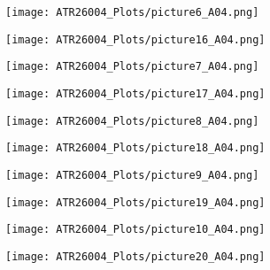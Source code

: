 \begin{figure}[H]
	\centering
	\begin{subfigure}[b]{0.45\textwidth}
		\texttt{[image: ATR26004\_Plots/picture6\_A04.png]}
	\end{subfigure}
	\hfill
	\begin{subfigure}[b]{0.45\textwidth}
		\texttt{[image: ATR26004\_Plots/picture16\_A04.png]}
	\end{subfigure}
\end{figure}

\begin{figure}[H]
	\centering
	\begin{subfigure}[b]{0.45\textwidth}
		\texttt{[image: ATR26004\_Plots/picture7\_A04.png]}
	\end{subfigure}
	\hfill
	\begin{subfigure}[b]{0.45\textwidth}
		\texttt{[image: ATR26004\_Plots/picture17\_A04.png]}
	\end{subfigure}
\end{figure}

\begin{figure}[H]
	\centering
	\begin{subfigure}[b]{0.45\textwidth}
		\texttt{[image: ATR26004\_Plots/picture8\_A04.png]}
	\end{subfigure}
	\hfill
	\begin{subfigure}[b]{0.45\textwidth}
		\texttt{[image: ATR26004\_Plots/picture18\_A04.png]}
	\end{subfigure}
\end{figure}

\begin{figure}[H]
	\centering
	\begin{subfigure}[b]{0.45\textwidth}
		\texttt{[image: ATR26004\_Plots/picture9\_A04.png]}
	\end{subfigure}
	\hfill
	\begin{subfigure}[b]{0.45\textwidth}
		\texttt{[image: ATR26004\_Plots/picture19\_A04.png]}
	\end{subfigure}
\end{figure}

\begin{figure}[H]
	\centering
	\begin{subfigure}[b]{0.45\textwidth}
		\texttt{[image: ATR26004\_Plots/picture10\_A04.png]}
	\end{subfigure}
	\hfill
	\begin{subfigure}[b]{0.45\textwidth}
		\texttt{[image: ATR26004\_Plots/picture20\_A04.png]}
	\end{subfigure}
\end{figure}

